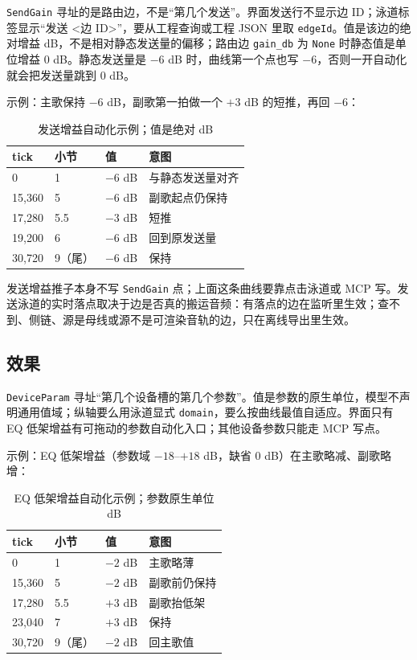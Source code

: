 \texttt{SendGain} 寻址的是路由边，不是“第几个发送”。界面发送行不显示边 ID；泳道标签显示“发送 <边 ID>”，要从工程查询或工程 JSON 里取 \texttt{edgeId}。值是该边的绝对增益 dB，不是相对静态发送量的偏移；路由边 \texttt{gain\_db} 为 \texttt{None} 时静态值是单位增益 0 dB。静态发送量是 $-6$ dB 时，曲线第一个点也写 $-6$，否则一开自动化就会把发送量跳到 0 dB。

示例：主歌保持 $-6$ dB，副歌第一拍做一个 $+3$ dB 的短推，再回 $-6$：

\begin{table}[htbp]
\centering
\small
\begin{tabular}{@{}llll@{}}
\hline
tick & 小节 & 值 & 意图 \\
\hline
0 & 1 & $-6$ dB & 与静态发送量对齐 \\
15{,}360 & 5 & $-6$ dB & 副歌起点仍保持 \\
17{,}280 & 5.5 & $-3$ dB & 短推 \\
19{,}200 & 6 & $-6$ dB & 回到原发送量 \\
30{,}720 & 9（尾） & $-6$ dB & 保持 \\
\hline
\end{tabular}
\caption{发送增益自动化示例；值是绝对 dB}
\label{tab:automation-send-recipe}
\end{table}

发送增益推子本身不写 \texttt{SendGain} 点；上面这条曲线要靠点击泳道或 MCP 写。发送泳道的实时落点取决于边是否真的搬运音频：有落点的边在监听里生效；查不到、侧链、源是母线或源不是可渲染音轨的边，只在离线导出里生效。

\subsection{效果}

\texttt{DeviceParam} 寻址“第几个设备槽的第几个参数”。值是参数的原生单位，模型不声明通用值域；纵轴要么用泳道显式 \texttt{domain}，要么按曲线最值自适应。界面只有 EQ 低架增益有可拖动的参数自动化入口；其他设备参数只能走 MCP 写点。

示例：EQ 低架增益（参数域 $-18$–$+18$ dB，缺省 0 dB）在主歌略减、副歌略增：

\begin{table}[htbp]
\centering
\small
\begin{tabular}{@{}llll@{}}
\hline
tick & 小节 & 值 & 意图 \\
\hline
0 & 1 & $-2$ dB & 主歌略薄 \\
15{,}360 & 5 & $-2$ dB & 副歌前仍保持 \\
17{,}280 & 5.5 & $+3$ dB & 副歌抬低架 \\
23{,}040 & 7 & $+3$ dB & 保持 \\
30{,}720 & 9（尾） & $-2$ dB & 回主歌值 \\
\hline
\end{tabular}
\caption{EQ 低架增益自动化示例；参数原生单位 dB}
\label{tab:automation-device-recipe}
\end{table}

